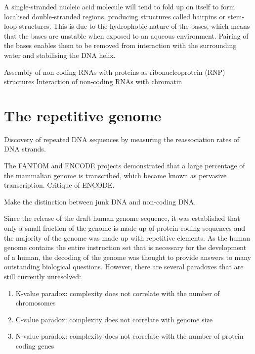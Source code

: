 A single-stranded nucleic acid molecule will tend to fold up on itself to form localised double-stranded regions, producing structures called hairpins or stem-loop structures. This is due to the hydrophobic nature of the bases, which means that the bases are unstable when exposed to an aqueous environment. Pairing of the bases enables them to be removed from interaction with the surrounding water and stabilising the DNA helix.

Assembly of non-coding RNAs with proteins as ribonucleoprotein (RNP) structures
Interaction of non-coding RNAs with chromatin

\section{The repetitive genome}

Discovery of repeated DNA sequences\cite{Britten1968} by measuring the reassociation rates of DNA strands.

The FANTOM and ENCODE projects demonstrated that a large percentage of the mammalian genome is transcribed, which became known as pervasive transcription\cite{pmid21765801}. Critique of ENCODE\cite{pmid23431001, pmid23479647, pmid23137679}.

Make the distinction between junk DNA and non-coding DNA.

Since the release of the draft human genome sequence\cite{venter2001sequence, lander2001initial}, it was established that only a small fraction of the genome is made up of protein-coding sequences and the majority of the genome was made up with repetitive elements. As the human genome contains the entire instruction set that is necessary for the development of a human, the decoding of the genome was thought to provide answers to many outstanding biological questions. However, there are several paradoxes that are still currently unresolved:

\begin{enumerate}
   \item K-value paradox: complexity does not correlate with the number of chromosomes
   \item C-value paradox: complexity does not correlate with genome size
   \item N-value paradox: complexity does not correlate with the number of protein coding genes
\end{enumerate}

